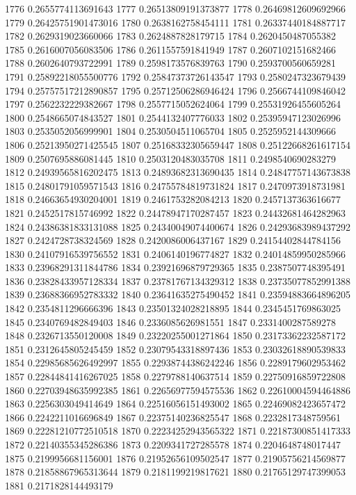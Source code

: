 1776 0.2655774113691643
1777 0.26513809191373877
1778 0.26469812609692966
1779 0.26425751901473016
1780 0.2638162758454111
1781 0.26337440184887717
1782 0.2629319023660066
1783 0.2624887828179715
1784 0.2620450487055382
1785 0.2616007056083506
1786 0.2611557591841949
1787 0.2607102151682466
1788 0.2602640793722991
1789 0.2598173576839763
1790 0.2593700560659281
1791 0.25892218055500776
1792 0.25847373726143547
1793 0.2580247323679439
1794 0.25757517212890857
1795 0.25712506286946424
1796 0.2566744109846042
1797 0.2562232229382667
1798 0.2557715052624064
1799 0.25531926455605264
1800 0.2548665074843527
1801 0.2544132407776033
1802 0.25395947123026996
1803 0.2535052056999901
1804 0.2530504511065704
1805 0.2525952144309666
1806 0.25213950271425545
1807 0.25168332305659447
1808 0.25122668261617154
1809 0.2507695886081445
1810 0.2503120483035708
1811 0.2498540690283279
1812 0.24939565816202475
1813 0.24893682313690435
1814 0.24847757143673838
1815 0.24801791059571543
1816 0.24755784819731824
1817 0.2470973918731981
1818 0.24663654930204001
1819 0.2461753282084213
1820 0.2457137363616677
1821 0.2452517815746992
1822 0.24478947170287457
1823 0.24432681464282963
1824 0.24386381833131088
1825 0.24340049074400674
1826 0.24293683989437292
1827 0.2424728738324569
1828 0.2420086006437167
1829 0.24154402844784156
1830 0.24107916539756552
1831 0.2406140196774827
1832 0.24014859950285966
1833 0.23968291311844786
1834 0.23921696879729365
1835 0.2387507748395491
1836 0.23828433957128334
1837 0.23781767134329312
1838 0.23735077852991388
1839 0.23688366952783332
1840 0.23641635275490452
1841 0.23594883664896205
1842 0.2354811296666396
1843 0.23501324028218895
1844 0.2345451769863025
1845 0.2340769482849403
1846 0.2336085626981551
1847 0.2331400287589278
1848 0.2326713550120008
1849 0.23220255001271864
1850 0.23173362232587172
1851 0.2312645805245459
1852 0.23079543318897436
1853 0.23032618890539833
1854 0.22985685626492997
1855 0.22938744386242246
1856 0.2289179602953462
1857 0.22844841416267025
1858 0.2279788140637514
1859 0.22750916859722808
1860 0.22703948635992385
1861 0.22656977594575536
1862 0.22610004594464886
1863 0.2256303049414649
1864 0.22516056151493002
1865 0.22469082423657472
1866 0.2242211016696849
1867 0.22375140236825547
1868 0.2232817348759561
1869 0.22281210772510518
1870 0.22234252943565322
1871 0.22187300851417333
1872 0.22140355345286386
1873 0.2209341727285578
1874 0.2204648748017447
1875 0.2199956681156001
1876 0.21952656109502547
1877 0.21905756214569877
1878 0.21858867965313644
1879 0.2181199219817621
1880 0.21765129747399053
1881 0.2171828144493179

